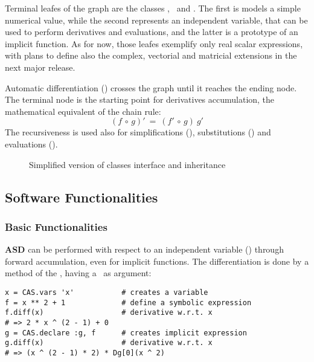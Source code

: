 Terminal leafes of the graph are the classes \CASConstant, \CASVariable~and \CASFunction. The first is models a simple numerical value, while the second represents an independent variable, that can be used to perform derivatives and evaluations, and the latter is a prototype of an implicit function. As for now, those leafes exemplify only real scalar expressions, with plans to define also the complex, vectorial and matricial extensions in the next major release.

Automatic differentiation (\CASOpdiff) crosses the graph until it reaches the ending node. The terminal node is the starting point for derivatives accumulation, the mathematical equivalent of the chain rule:
\begin{equation}
\left( f  \, \circ \, g \right)' \: = \:
\left( f' \, \circ \, g \right) \: g'
\end{equation}
The recursiveness is used also for simplifications (\CASOpsimplify), substitutions (\CASOpsubs) and evaluations (\CASOpcall).

\begin{figure}[ht!]
\label{fig:uml-container}
\centering

\caption{Simplified version of classes interface and inheritance}
\end{figure}

\subsection{Software Functionalities}
\label{sec:functionalities}

\subsubsection{Basic Functionalities}
\textbf{ASD} can be performed with respect to an independent variable (\CASVariable) through forward accumulation, even for implicit functions. The differentiation is done by a method of the \CASOp, having a \CASVariable~as argument:

\begin{lstlisting}[caption={Differentiation example},label={code:example-diff}]
x = CAS.vars 'x'           # creates a variable
f = x ** 2 + 1             # define a symbolic expression
f.diff(x)                  # derivative w.r.t. x
# => 2 * x ^ (2 - 1) + 0
g = CAS.declare :g, f      # creates implicit expression
g.diff(x)                  # derivative w.r.t. x
# => (x ^ (2 - 1) * 2) * Dg[0](x ^ 2)
\end{lstlisting}

